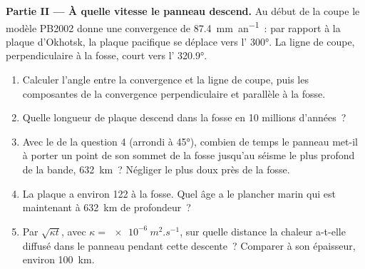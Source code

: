 \begin{problem}
\medskip
\noindent\textbf{Partie II --- À quelle vitesse le panneau descend.} Au début de la
coupe le modèle PB2002 donne une convergence de \qty{87.4}{mm.an^{-1}}~: par rapport
à la plaque d'Okhotsk, la plaque pacifique se déplace vers l' \ang{300}. La
ligne de coupe, perpendiculaire à la fosse, court vers l' \ang{320.9}.
\begin{enumerate}[resume]
  \item Calculer l'angle entre la convergence et la ligne de coupe, puis
        les composantes de la convergence perpendiculaire et parallèle à la
        fosse.
  \item Quelle longueur de plaque descend dans la fosse en 10 millions d'années~?
  \item Avec le  de la question 4 (arrondi à \ang{45}), combien de temps
        le panneau met-il à porter un point de son sommet de la fosse jusqu'au
        séisme le plus profond de la bande, \qty{632}{km}~? Négliger le  plus
        doux près de la fosse.
  \item La plaque a environ \qty{122}{\Ma} à la fosse. Quel âge a le
        plancher marin qui est maintenant à \qty{632}{km} de profondeur~?
  \item Par $\sqrt{\kappa t}$, avec $\kappa = \qty{e-6}{m^2.s^{-1}}$, sur quelle distance
        la chaleur a-t-elle diffusé dans le panneau pendant cette descente~? Comparer à son
        épaisseur, environ \qty{100}{km}.
\end{enumerate}


\end{problem}
